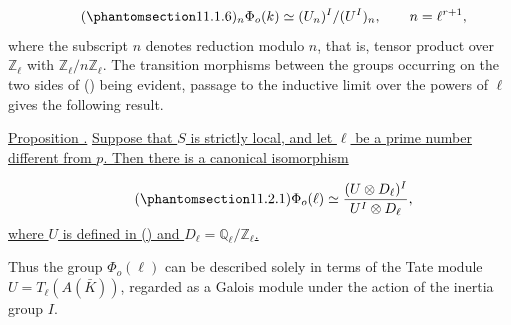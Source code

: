 \begin{equation}\tag{\SGARefTarget{sga7.sga7i.eix.n11-1-6}{11.1.6}}
{}_n\Phi_o(k)\simeq (U_n)^I/(U^I)_n,
 \qquad n=\ell^{r+1},
\end{equation}
where the subscript $n$ denotes reduction modulo $n$, that is, tensor
product over $\mathbb Z_\ell$ with
$\mathbb Z_\ell/n\mathbb Z_\ell$. The transition morphisms between the
groups occurring on the two sides of () being evident, passage to
the inductive limit over the powers of $\ell$ gives the following
result.

\medskip
\noindent
\underline{Proposition .} \underline{Suppose that $S$ is strictly
local, and let $\ell$ be a prime number different from $p$. Then there is
a canonical isomorphism}

\begin{equation}\tag{\SGARefTarget{sga7.sga7i.eix.n11-2-1}{11.2.1}}
\Phi_o(\ell)\simeq
 \frac{(U\otimes D_\ell)^I}{U^I\otimes D_\ell},
\end{equation}
\underline{where $U$ is defined in () and
$D_\ell=\mathbb Q_\ell/\mathbb Z_\ell$.}

Thus the group $\Phi_o(\ell)$ can be described solely in terms of the
Tate module $U=T_\ell(A(\bar K))$, regarded as a Galois module under the
action of the inertia group $I$.
